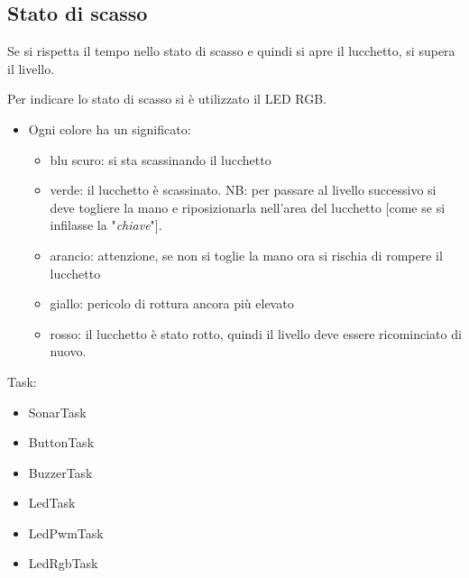 \subsection{Stato di scasso}
Se si rispetta il tempo nello stato di scasso e quindi si apre il lucchetto, si supera il livello.

Per indicare lo stato di scasso si è utilizzato il LED RGB. 
\begin{itemize}
	\item Ogni colore ha un significato:
	\begin{itemize}
		\item blu scuro: si sta scassinando il lucchetto
		\item verde: il lucchetto è scassinato.
			\subitem NB: per passare al livello successivo si deve togliere la mano e riposizionarla nell'area del lucchetto [come se si infilasse la "\textit{chiave}"].
		\item arancio: attenzione, se non si toglie la mano ora si rischia di rompere il lucchetto
		\item giallo: pericolo di rottura ancora più elevato
		\item rosso: il lucchetto è stato rotto, quindi il livello deve essere ricominciato di nuovo.
	\end{itemize}
\end{itemize}

Task:
\begin{itemize}
	\item SonarTask
	\item ButtonTask
	\item BuzzerTask
	\item LedTask
	\item LedPwmTask
	\item LedRgbTask
\end{itemize}